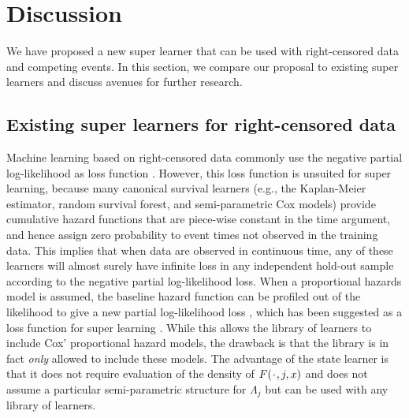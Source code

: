 \documentclass[a4,danish]{article}
\begin{document}
\section{Discussion}
\label{sec:discussion}

We have proposed a new super learner that can be used with right-censored data
and competing events. In this section, we compare our proposal to existing super
learners and discuss avenues for further research.

\subsection{Existing super learners for right-censored data}
\label{sec:relat-liter-exist}

Machine learning based on right-censored data commonly use the negative partial
log-likelihood as loss function
\citep[e.g.,][]{li2016regularized,yao2017deep,lee2018deephit,katzman2018deepsurv,gensheimer2019scalable,lee2021boosted,kvamme2021continuous}.
However, this loss function is unsuited for super learning, because many
canonical survival learners (e.g., the Kaplan-Meier estimator, random survival
forest, and semi-parametric Cox models) provide cumulative hazard functions that
are piece-wise constant in the time argument, and hence assign zero probability
to event times not observed in the training data. This implies that when data
are observed in continuous time, any of these learners will almost surely have
infinite loss in any independent hold-out sample according to the negative
partial log-likelihood loss. When a proportional hazards model is assumed, the
baseline hazard function can be profiled out of the likelihood to give a new
partial log-likelihood loss \citep{cox1972regression}, which has been suggested
as a loss function for super learning
\citep{golmakani2020super,verweij1993cross}. While this allows the library of
learners to include Cox' proportional hazard models, the drawback is that the
library is in fact \textit{only} allowed to include these models. The advantage
of the state learner is that it does not require evaluation of the density of
\( F(\blank, j, x) \) and does not assume a particular semi-parametric structure
for $\Lambda_j$ but can be used with any library of learners.
\end{document}

